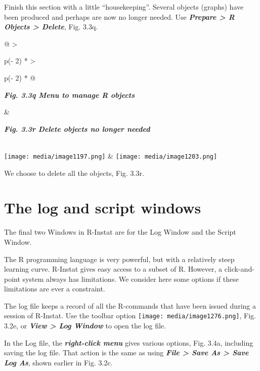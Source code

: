 \documentclass[
  letterpaper,
  DIV=11,
  numbers=noendperiod]{scrreprt}
\begin{document}
Finish this section with a little ``housekeeping''. Several objects
(graphs) have been produced and perhaps are now no longer needed. Use
\textbf{\emph{Prepare \textgreater{} R Objects \textgreater{} Delete}},
Fig. 3.3q.

\begin{longtable}[]{@{}
  >{\raggedright\arraybackslash}p{(\columnwidth - 2\tabcolsep) * }
  >{\raggedright\arraybackslash}p{(\columnwidth - 2\tabcolsep) * }@{}}
\toprule\noalign{}
\begin{minipage}[b]{\linewidth}\raggedright
\textbf{\emph{Fig. 3.3q Menu to manage R objects}}
\end{minipage} & \begin{minipage}[b]{\linewidth}\raggedright
\textbf{\emph{Fig. 3.3r Delete objects no longer needed}}
\end{minipage} \\
\midrule\noalign{}
\endhead
\bottomrule\noalign{}
\endlastfoot
\texttt{[image: media/image1197.png]}
&
\texttt{[image: media/image1203.png]} \\
\end{longtable}

We choose to delete all the objects, Fig. 3.3r.

\section{The log and script windows}\label{the-log-and-script-windows}

The final two Windows in R-Instat are for the Log Window and the Script
Window.

The R programming language is very powerful, but with a relatively steep
learning curve. R-Instat gives easy access to a subset of R. However, a
click-and-point system always has limitations. We consider here some
options if these limitations are ever a constraint.

The log file keeps a record of all the R-commands that have been issued
during a session of R-Instat. Use the toolbar option
\texttt{[image: media/image1276.png]},
Fig. 3.2e, or \textbf{\emph{View \textgreater{} Log Window}} to open the
log file.

In the Log file, the \textbf{\emph{right-click menu}} gives various
options, Fig. 3.4a, including saving the log file. That action is the
same as using \textbf{\emph{File \textgreater{} Save As \textgreater{}
Save Log As}}, shown earlier in Fig. 3.2c.
\end{document}
